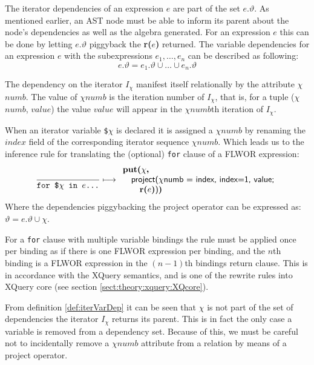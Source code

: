 The iterator dependencies of an expression $e$ are part of the set $e.\vartheta$. As mentioned earlier,
an AST node must be able to inform its parent about the node's dependencies as well as the algebra generated. For
an expression $e$ this can be done by letting $e.\vartheta$ piggyback the \textbf{r(}$e$\textbf{)} returned. The
variable dependencies for an expression $e$ with the subexpressions $e_{1},\ldots,e_{n}$ can be described as
following:
\begin{equation}
e.\vartheta = e_{1}.\vartheta\cup\ldots\cup e_{n}.\vartheta
\label{eq:trans:TD:depInheritance}
\end{equation}

The dependency on the iterator $I_{\chi}$ manifest itself relationally by the
attribute $\chi$$numb$. The value of $\chi$$numb$ is the iteration number of $I_{\chi}$, that is, for a tuple ($\chi$$numb$, $value$) the value $value$
will appear in the $\chi$$numb$th iteration of $I_{\chi}$.

When an iterator variable \texttt{\$}$\chi$ is declared it is assigned a $\chi$$numb$ by renaming the $index$
field of the corresponding iterator sequence $\chi$$numb$. Which leads us to the inference rule for translating the
(optional) \texttt{for} clause of a FLWOR expression:
\begin{equation}
\frac{}{\mbox{\texttt{for \$}}\chi \mbox{\texttt{ in }} e \mbox{\texttt{\ldots}}}\longmapsto
\begin{array}{l}
\mbox{\textbf{put(}}\chi\mbox{\textbf{, }} \\ \quad
\mbox{\textsf{project(}}\chi\mbox{\textsf{numb = index, index=1, value;}} \\ \quad \quad
\mbox{\textbf{r(}}e\mbox{\textbf{)}\textsf{)}\textbf{)}}
\end{array}
\label{rule:trans:TD:forbind}
\end{equation}
Where the dependencies piggybacking the \textsf{project} operator can be
expressed as: $\vartheta = e.\vartheta \cup \chi$.

For a \texttt{for} clause with multiple variable bindings the rule must be applied once per binding as if there
is one FLWOR expression per binding, and the $n$th binding is a FLWOR expression in the $(n-1)$th bindings
return clause. This is in accordance with the XQuery semantics, and is one of the rewrite rules into XQuery core
(see section \ref{sect:theory:xquery:XQcore}).

From definition \ref{def:iterVarDep} it can be seen that $\chi$ is not part of
the set of dependencies the iterator $I_{\chi}$ returns its parent. This is in fact the only case a variable is removed from a dependency set. Because
of this, we must be careful not to incidentally remove a $\chi$$numb$ attribute from a relation by means of a
\textsf{project} operator. 

